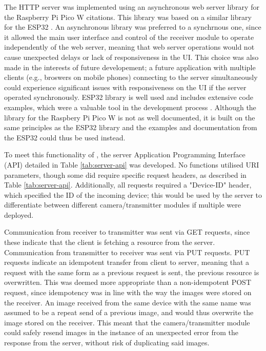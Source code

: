 \documentclass[class=report,11pt,crop=false]{standalone}
\begin{document}
The HTTP server was implemented using an asynchronous web server library for the Raspberry Pi Pico W citations\cite{hoang2023async}. This library was based on a similar library for the ESP32 \cite{gochkov2023async}. An asynchronous library was preferred to a synchrnous one, since it allowed the main user interface and control of the receiver module to operate independently of the web server, meaning that web server operations would not cause unexpected delays or lack of responsiveness in the UI. This choice was also made in the interests of future developement; a future application with multiple clients (e.g., broswers on mobile phones) connecting to the server simultaneously could experience significant issues with responsiveness on the UI if the server operated synchronously. ESP32 library is well used and includes extensive code examples, which were a valuable tool in the development process  \cite{hoang2023async}. Although the library for the Raspbery Pi Pico W is not as well documented, it is built on the same principles as the ESP32 library and the examples and documentation from the ESP32 could thus be used instead.


To meet this functionality of , the server Application Programming Interface (API) detailed in Table \ref{tab:server-api} was developed. No functions utilised URI parameters, though some did require specific request headers, as described in Table \ref{tab:server-api}. Additionally, all requests required a "Device-ID" header, which specified the ID of the incoming device; this would be used by the server to differentiate between different camera/transmitter modules if multiple were deployed.


Communication from receiver to transmitter was sent via GET requests, since these indicate that the client is fetching a resource from the server. Communication from transmitter to receiver was sent via PUT requests. PUT requests indicate an idempotent transfer from client to server, meaning that a request with the same form as a previous request is sent, the previous resource is overwritten. This was deemed more appropriate than a non-idempotent POST request, since idempotency was in line with the way the images were stored on the receiver. An image received from the same device with the same name was assumed to be a repeat send of a previous image, and would thus overwrite the image stored on the receiver. This meant that the camera/transmitter module could safely resend images in the instance of an unexpected error from the response from the server, without risk of duplicating said images.
\end{document}
